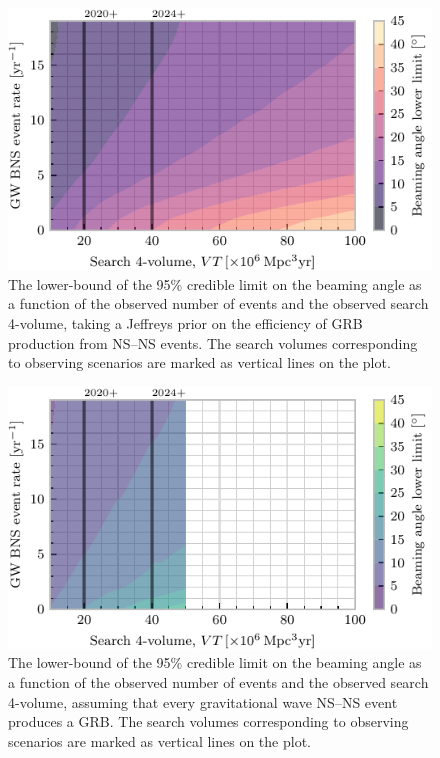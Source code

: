\documentclass[twocolumn]{aastex61}
\newcommand{\BNS}{\ac{NS}--\ac{NS}\xspace}
\begin{document}
\begin{figure}
\centering
\includegraphics[width=\linewidth]{volume_v_nevents_lower.pdf}
\caption{\label{fig:volumevevents_lower} The lower-bound of the 95\%
  credible limit on the beaming angle as a function of the observed
  number of events and the observed search 4-volume, taking a Jeffreys
  prior on the efficiency of \ac{GRB} production from \BNS
  events. The search volumes corresponding to observing scenarios
  are marked as vertical lines on the plot.}
\end{figure}

\begin{figure}
\centering
\includegraphics[width=\linewidth]{volume_v_nevents_lower_e1.pdf}
\caption{\label{fig:volumevevents_lowere1} The lower-bound of the 95\%
  credible limit on the beaming angle as a function of the observed
  number of events and the observed search 4-volume, assuming that
  every gravitational wave \BNS event produces a \ac{GRB}. The search
  volumes corresponding to observing scenarios are marked as vertical
  lines on the plot.}
\end{figure}
\end{document}
